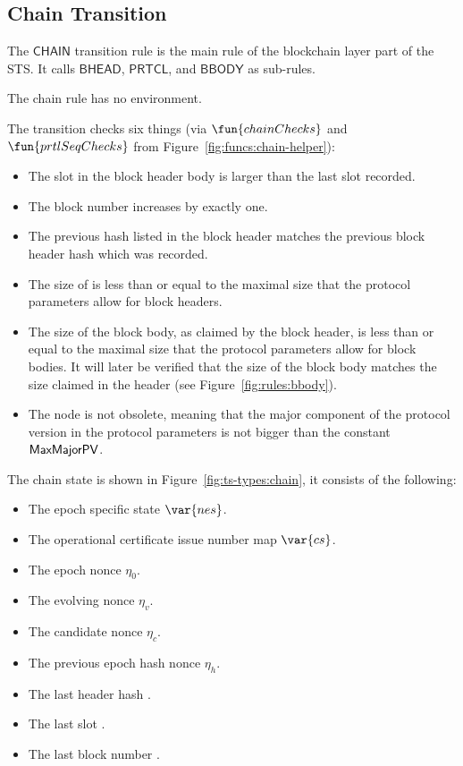 \clearpage

\subsection{Chain Transition}
\label{sec:chain-trans}

The $\mathsf{CHAIN}$ transition rule is the main rule of the blockchain layer
part of the STS. It calls $\mathsf{BHEAD}$, $\mathsf{PRTCL}$, and $\mathsf{BBODY}$ as sub-rules.

The chain rule has no environment.

The transition checks six things
(via $\fun{chainChecks}$ and $\fun{prtlSeqChecks}$ from Figure~\ref{fig:funcs:chain-helper}):
\begin{itemize}
\item The slot in the block header body is larger than the last slot recorded.
\item The block number increases by exactly one.
\item The previous hash listed in the block header matches the previous
  block header hash which was recorded.
\item The size of  is less than or equal to the maximal size that the
  protocol parameters allow for block headers.
\item The size of the block body, as claimed by the block header, is less than or equal to the
  maximal size that the protocol parameters allow for block bodies.
  It will later be verified that the size of the block body matches the size claimed
  in the header (see Figure~\ref{fig:rules:bbody}).
\item The node is not obsolete, meaning that the major component of the
  protocol version in the protocol parameters
  is not bigger than the constant $\mathsf{MaxMajorPV}$.
\end{itemize}


The chain state is shown in Figure~\ref{fig:ts-types:chain}, it consists of the
following:

\begin{itemize}
  \item The epoch specific state $\var{nes}$.
  \item The operational certificate issue number map $\var{cs}$.
  \item The epoch nonce $\eta_0$.
  \item The evolving nonce $\eta_v$.
  \item The candidate nonce $\eta_c$.
  \item The previous epoch hash nonce $\eta_h$.
  \item The last header hash .
  \item The last slot .
  \item The last block number .
\end{itemize}

